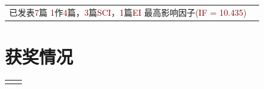 \documentclass[10pt]{article} %
\newcommand{\IF}[1]{\textcolor{Maroon}{(IF = #1)}}
\begin{document}
\begin{paracol}{2}
\begin{supertabular}{rl}
		{已发表\textcolor{Maroon}{7}篇}
		{\textcolor{Maroon}{1}作\textcolor{Maroon}{4}篇，\textcolor{Maroon}{3}篇\textcolor{Maroon}{SCI}，\textcolor{Maroon}{1}篇\textcolor{Maroon}{EI}}
		{}
		{最高影响因子\IF{10.435}}
		
		
	\end{supertabular}

	\medskip %
	
	
	\section{获奖情况}
	
	
	
	
	
	\begin{supertabular}{rl} %
		
		
		
		
		
		
		
		
	\end{supertabular}
	

\end{paracol}
\end{document}
